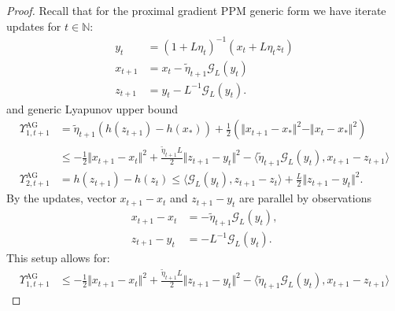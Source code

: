 \documentclass[12pt]{article}
\begin{document}
        \begin{proof}
            Recall that for the proximal gradient PPM generic form we have iterate updates for $t\in \mathbb N$: 
            \begin{align*}
                y_t &= (1 + L\eta_t)^{-1}(x_t + L\eta_t z_t)
                \\
                x_{t + 1} &= x_t - \tilde \eta_{t + 1} \mathcal G_L(y_t)
                \\
                z_{t + 1} &= y_t - L^{-1}\mathcal G_L(y_t). 
            \end{align*}
            and generic Lyapunov upper bound 
            \begin{align*}
                \Upsilon_{1, t + 1}^\text{AG}
                &= 
                \tilde\eta_{t + 1} (h(z_{t + 1}) - h(x_*)) + 
                \frac{1}{2} (
                    \Vert x_{t + 1} - x_*\Vert^2
                    - 
                    \Vert x_t - x_*\Vert^2
                )
                \\
                &\le 
                - \frac{1}{2}\Vert x_{t + 1} - x_t\Vert^2 
                + \frac{\tilde\eta_{t + 1}L}{2}\Vert z_{t + 1} - y_t\Vert^2
                - \langle 
                    \tilde\eta_{t + 1} \mathcal G_L(y_t), 
                    x_{t + 1} - z_{t + 1}
                \rangle
                \\
                \Upsilon_{2, t + 1}^\text{AG}
                &= 
                h(z_{t + 1}) - h(z_t) 
                \le 
                \langle \mathcal G_L(y_t), z_{t + 1} - z_t\rangle + 
                \frac{L}{2}\Vert z_{t + 1} - y_t\Vert^2. 
            \end{align*}
            By the updates, vector $x_{t + 1} - x_t$ and $z_{t + 1} - y_t$ are parallel by observations 
            \begin{align*}
                x_{t + 1} - x_t &= -\tilde\eta_{t + 1}\mathcal G_L(y_t), 
                \\
                z_{t + 1} - y_t &= -L^{-1}\mathcal G_L(y_t). 
            \end{align*}
            This setup allows for: 
            \begin{align*}
                \Upsilon_{1, t + 1}^{\text{AG}} 
                &\le 
                - \frac{1}{2}\Vert x_{t + 1} - x_t\Vert^2 + 
                \frac{\tilde\eta_{t + 1}L}{2}\Vert z_{t + 1} - y_t\Vert^2 
                - 
                \langle \tilde\eta_{t + 1}\mathcal G_L (y_t), x_{t + 1} - z_{t + 1} \rangle

\end{align*}
\end{proof}
\end{document}
